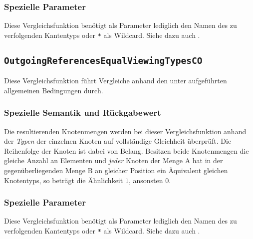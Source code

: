 \subsubsection*{Spezielle Parameter}
Diese Vergleichsfunktion benötigt als Parameter lediglich den Namen des zu verfolgenden Kantentyps oder \texttt{*} als Wildcard. Siehe dazu auch .

%
%
\subsection{\texttt{OutgoingReferencesEqualViewingTypesCO}}
Diese Vergleichsfunktion führt Vergleiche anhand den unter\mylinebreak{} aufgeführten allgemeinen Bedingungen durch.

\subsubsection*{Spezielle Semantik und Rückgabewert}
Die resultierenden Knotenmengen werden bei dieser Vergleichsfunktion anhand der \emph{Typen} der einzelnen Knoten auf vollständige Gleichheit überprüft. Die Reihenfolge der Knoten ist dabei von Belang. Besitzen beide Knotenmengen die gleiche Anzahl an Elementen und \emph{jeder} Knoten der Menge A hat in der gegenüberliegenden Menge B an gleicher Position ein Äquivalent gleichen Knotentyps, so beträgt die Ähnlichkeit $1$, ansonsten $0$.

\subsubsection*{Spezielle Parameter}
Diese Vergleichsfunktion benötigt als Parameter lediglich den Namen des zu verfolgenden Kantentyps oder \texttt{*} als Wildcard. Siehe dazu auch .